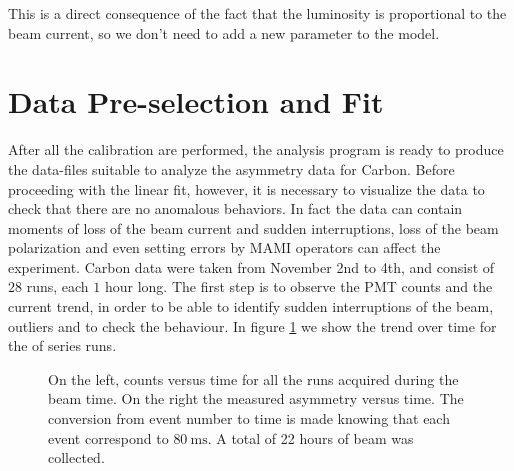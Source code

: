 This is a direct consequence of the fact that the luminosity is proportional to the beam current, so we don't need to add a new parameter to the model.

\section{Data Pre-selection and Fit}

After all the calibration are performed, the analysis program is ready to produce the data-files suitable to analyze the asymmetry data for Carbon. Before proceeding with the linear fit, however, it is necessary to visualize the data to check that there are no anomalous behaviors. In fact the data can contain moments of loss of the beam current and sudden interruptions, loss of the beam polarization and even setting errors by MAMI operators can affect the experiment. Carbon data were taken from November 2nd to 4th, and consist of $28$ runs, each $1$ hour long.
The first step is to observe the PMT counts and the current trend, in order to be able to identify sudden interruptions of the beam, outliers and to check the behaviour. In figure \ref{fig::CountTrend} we show the trend over time for the of series runs.

\begin{figure}[hbtp]
\centering
{}
\caption{On the left, counts versus time for all the runs acquired during the beam time. On the right the measured asymmetry versus time. The conversion from event number to time is made knowing that each event correspond to $\SI{80}{\milli \second}$. A total of 22 hours of beam was collected.}
\label{fig::CountTrend}
\end{figure}

